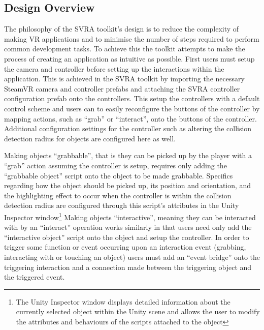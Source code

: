 \documentclass{l4proj}
\begin{document}
\subsection{Design Overview}
\label{sec:decisiondesignoverview}
The philosophy of the SVRA toolkit's design is to reduce the complexity of making VR applications and to minimise the number of steps required to perform common development tasks. To achieve this the toolkit attempts to make the process of creating an application as intuitive as possible. First users must setup the camera and controller before setting up the interactions within the application. This is achieved in the SVRA toolkit by importing the necessary SteamVR camera and controller prefabs and attaching the SVRA controller configuration prefab onto the controllers. This setup the controllers with a default control scheme and users can to easily reconfigure the buttons of the controller by mapping actions, such as ``grab'' or ``interact'', onto the buttons of the controller. Additional configuration settings for the controller such as altering the collision detection radius for objects are configured here as well. 

Making objects ``grabbable'', that is they can be picked up by the player with a ``grab'' action assuming the controller is setup, requires only adding the ``grabbable object'' script onto the object to be made grabbable. Specifics regarding how the object should be picked up, its position and orientation, and the highlighting effect to occur when the controller is within the collision detection radius are configured through this script's attributes in the Unity Inspector window\footnote{The Unity Inspector window displays detailed information about the currently selected object within the Unity scene and allows the user to modify the attributes and behaviours of the scripts attached to the object} Making objects ``interactive'', meaning they can be interacted with by an ``interact'' operation works similarly in that users need only add the ``interactive object'' script onto the object and setup the controller. In order to trigger some function or event occurring upon an interaction event (grabbing, interacting with or touching an object) users must add an ``event bridge'' onto the triggering interaction and a connection made between the triggering object and the triggered event. 
\end{document}
